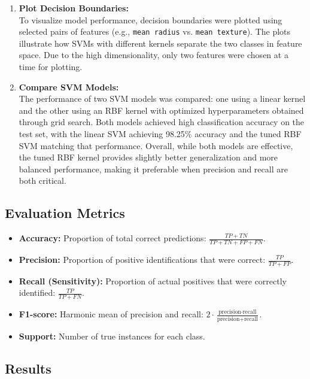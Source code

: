 \documentclass[a4paper,12pt]{article}
\begin{document}
\begin{enumerate}
    \item \textbf{Plot Decision Boundaries:} \\
    To visualize model performance, decision boundaries were plotted using selected pairs of features (e.g., \texttt{mean radius} vs. \texttt{mean texture}). The plots illustrate how SVMs with different kernels separate the two classes in feature space. Due to the high dimensionality, only two features were chosen at a time for plotting.

    \item \textbf{Compare SVM Models:} \\
    The performance of two SVM models was compared: one using a linear kernel and the other using an RBF kernel with optimized hyperparameters obtained through grid search. Both models achieved high classification accuracy on the test set, with the linear SVM achieving 98.25\% accuracy and the tuned RBF SVM matching that performance.
    Overall, while both models are effective, the tuned RBF kernel provides slightly better generalization and more balanced performance, making it preferable when precision and recall are both critical.
    
\end{enumerate}


\subsection{Evaluation Metrics}
\begin{itemize}
    \item \textbf{Accuracy:} Proportion of total correct predictions: \( \frac{TP + TN}{TP + TN + FP + FN} \).
    \item \textbf{Precision:} Proportion of positive identifications that were correct: \( \frac{TP}{TP + FP} \).
    \item \textbf{Recall (Sensitivity):} Proportion of actual positives that were correctly identified: \( \frac{TP}{TP + FN} \).
    \item \textbf{F1-score:} Harmonic mean of precision and recall: \( 2 \cdot \frac{\text{precision} \cdot \text{recall}}{\text{precision} + \text{recall}} \).
    \item \textbf{Support:} Number of true instances for each class.
\end{itemize}

\subsection{Results}
\end{document}
